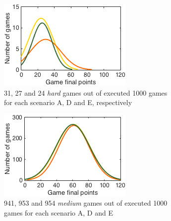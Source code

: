 \begin{figure}[h]
        \centering
        \begin{subfigure}[h]{0.32\textwidth}
                \includegraphics[width=\textwidth]{./img/4/ADEhard}
                \caption{31, 27 and 24 \emph{hard} games out of executed 1000 games for each scenario A, D and E, respectively}
                \label{fig:ADEhard}
        \end{subfigure}
        \begin{subfigure}[h]{0.32\textwidth}
                \includegraphics[width=\textwidth]{./img/4/ADEmedium}
                \caption{941, 953 and 954 \emph{medium} games out of executed 1000 games for each scenario A, D and E}
                \label{fig:ADEmedium}
        \end{subfigure}
        \begin{subfigure}[h]{0.32\textwidth}

\end{subfigure}
\end{figure}

